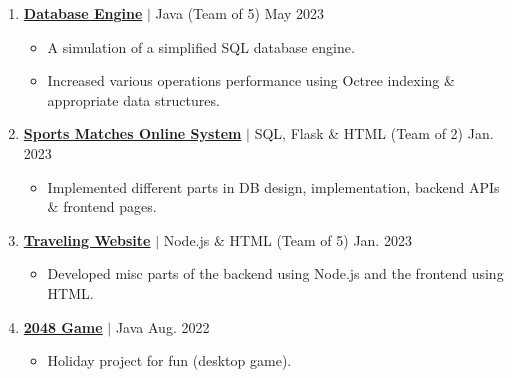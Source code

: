 \documentclass[a4paper,11pt]{article}
\begin{document}
\begin{enumerate}
    \item \href{https://github.com/hosain-ghoraba/Simple_Database_Engine/tree/main} {\textbf{\color[rgb]{0,0,1} Database Engine}} $|$ {Java} (Team of 5)  \hfill {May 2023}
          \begin{itemize}
              \item A simulation of a simplified SQL database engine.
              \item Increased various operations performance using Octree indexing \& appropriate data structures.
          \end{itemize}
          

    \item \href{https://github.com/hosain-ghoraba/Sports-Management_Registration-DBMS} {\textbf{\color[rgb]{0,0,1} Sports Matches Online System}} $|$ {SQL, Flask \& HTML} (Team of 2) \hfill {Jan. 2023}
        \begin{itemize}
            \item Implemented different parts in DB design, implementation, backend APIs \& frontend pages.
        \end{itemize}
        


    \item \href{https://github.com/hosain-ghoraba/Travelling-Website} {\textbf{\color[rgb]{0,0,1} Traveling Website}} $|$ {Node.js \& HTML} (Team of 5) \hfill {Jan. 2023}
          \begin{itemize}
              \item Developed misc parts of the backend using Node.js and the frontend using HTML.
          \end{itemize}

    \item \href{https://github.com/hosain-ghoraba/Extended-2048-Game} {\textbf{\color[rgb]{0,0,1} 2048 Game}} $|$ {Java}  \hfill {Aug. 2022}
          \begin{itemize}
              \item Holiday project for fun (desktop game).
          \end{itemize}

\end{enumerate}
\end{document}
